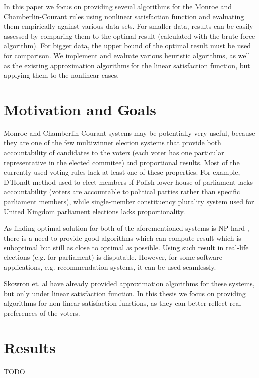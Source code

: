 In this paper we focus on providing several algorithms for the Monroe and Chamberlin-Courant rules using nonlinear satisfaction function and evaluating them empirically against various data sets. For smaller data, results can be easily assessed by comparing them to the optimal result (calculated with the brute-force algorithm). For bigger data, the upper bound of the optimal result must be used for comparison. We implement and evaluate various heuristic algorithms, as well as the existing approximation algorithms for the linear satisfaction function, but applying them to the nonlinear cases.

\section{Motivation and Goals}

Monroe and Chamberlin-Courant systems may be potentially very useful, because they are one of the few multiwinner election systems that provide both accountability of candidates to the voters (each voter has one particular representative in the elected commitee) and proportional results. Most of the currently used voting rules lack at least one of these properties. For example, D'Hondt method used to elect members of Polish lower house of parliament lacks accountability (voters are accountable to political parties rather than specific parliament members), while single-member constituency plurality system used for United Kingdom parliament elections lacks proportionality.

As finding optimal solution for both of the aforementioned systems is NP-hard \cite{2}, there is a need to provide good algorithms which can compute result which is suboptimal but still as close to optimal as possible. Using such result in real-life elections (e.g. for parliament) is disputable. However, for some software applications, e.g. recommendation systems, it can be used seamlessly.

Skowron et. al \cite{1} have already provided approximation algorithms for these systems, but only under linear satisfaction function. In this thesis we focus on providing algorithms for non-linear satisfaction functions, as they can better reflect real preferences of the voters.

\section{Results}

TODO
